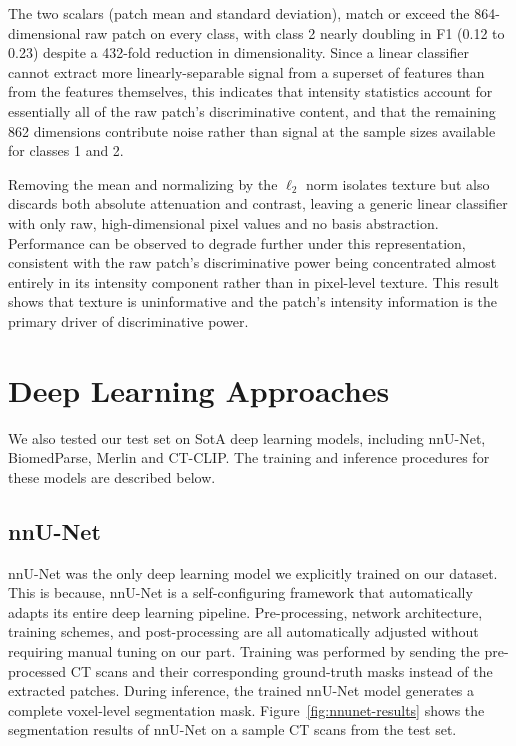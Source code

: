 The two scalars (patch mean and standard deviation),
match or exceed the 864-dimensional raw patch on every class, with class 2 nearly doubling in F1 (0.12 to 0.23) despite a
432-fold reduction in dimensionality. Since a linear classifier cannot extract more
linearly-separable signal from a superset of features than from the features
themselves, this indicates that intensity statistics account for essentially all of the
raw patch's discriminative content, and that the remaining 862 dimensions contribute
noise rather than signal at the sample sizes available for classes 1 and 2.

Removing the mean and normalizing by the $\ell_2$ norm isolates texture but also
discards both absolute attenuation and contrast, leaving a generic linear classifier
with only raw, high-dimensional pixel values and no basis abstraction. Performance
can be observed to degrade further under this representation, consistent with the raw patch's
discriminative power being concentrated almost entirely in its intensity component
rather than in pixel-level texture. This result shows that texture is uninformative and the patch's intensity information is
the primary driver of discriminative power.

\section{Deep Learning Approaches}

We also tested our test set on SotA deep learning models, including nnU-Net, BiomedParse, Merlin and CT-CLIP.
The training and inference procedures for these models are described below.

\subsection{nnU-Net}

nnU-Net was the only deep learning model we explicitly trained on our dataset.
This is because, nnU-Net is a self-configuring framework that automatically adapts its entire deep learning pipeline.
Pre-processing, network architecture, training schemes, and post-processing
are all automatically adjusted without requiring manual tuning on our part.
Training was performed by sending the pre-processed CT scans and their corresponding ground-truth masks instead of the extracted patches.
During inference, the trained nnU-Net model generates a complete voxel-level segmentation mask.
Figure~\ref{fig:nnunet-results} shows the segmentation results of nnU-Net on a sample CT scans from the test set.

